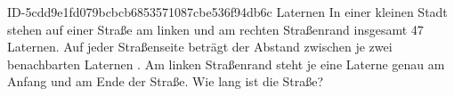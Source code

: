 \begin{exercise}
      {ID-5cdd9e1fd079bcbcb6853571087cbe536f94db6c}
      {Laternen}
  \ifproblem\problem
    In einer kleinen Stadt stehen auf einer Straße am linken und am rechten
    Straßenrand insgesamt 47 Laternen.
    Auf jeder Straßenseite beträgt der Abstand zwischen je zwei benachbarten
    Laternen .
    Am linken Straßenrand steht je eine Laterne genau am Anfang und am Ende
    der Straße.
    Wie lang ist die Straße?
  \fi
\end{exercise}
